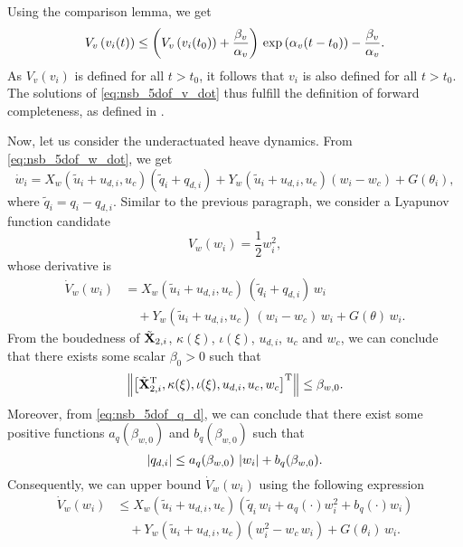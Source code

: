 Using the comparison lemma, we get
\begin{equation}
    V_v\left(v_i(t)\right) \leq \left(V_v\left(v_i(t_0)\right) + \frac{\beta_v}{\alpha_v}\right)\,{\rm exp}\left(\alpha_v(t - t_0)\right) - \frac{\beta_v}{\alpha_v}.
\end{equation}
As $V_v(v_i)$ is defined for all $t > t_0$, it follows that $v_i$ is also defined for all $t > t_0$.
The solutions of \eqref{eq:nsb_5dof_v_dot} thus fulfill the definition of forward completeness, as defined in \cite{angeli_forward_1999}.

Now, let us consider the underactuated heave dynamics.
From \eqref{eq:nsb_5dof_w_dot}, we get
\begin{equation}
    \dot{w}_i = X_w\!\left(\tilde{u}_i + u_{d,i}, u_c\right)\left(\tilde{q}_i + q_{d,i}\right) + Y_w\!\left(\tilde{u}_i + u_{d,i}, u_c\right)\left(w_i - w_c\right) + G(\theta_i),
\end{equation}
where $\tilde{q}_i = q_i - q_{d,i}$.
Similar to the previous paragraph, we consider a Lyapunov function candidate
\begin{equation}
    V_w(w_i) = \frac{1}{2} w_i^2, \label{eq:nsb_5dof_V_w}
\end{equation}
whose derivative is
\begin{equation}
    \begin{split}
        \dot{V}_w(w_i) &= X_w\left(\tilde{u}_i + u_{d,i}, u_c\right)\,\left(\tilde{q}_i + q_{d,i}\right)\,w_i \\
        &\quad + Y_w\left(\tilde{u}_i + u_{d,i}, u_c\right)\,\left(w_i - w_c\right)\,w_i + G(\theta)\,w_i.
    \end{split}
\end{equation}
From the boudedness of $\tilde{\mathbf{X}}_{2,i}$, $\kappa(\xi)$, $\iota(\xi)$, $u_{d,i}$, $u_c$ and $w_c$, we can conclude that there exists some scalar $\beta_0 > 0$ such that 
\begin{equation}
    \left\| \left[ \tilde{\mathbf{X}}_{2,i}^{\mathrm{T}}, \kappa(\xi), \iota(\xi), u_{d,i}, u_c, w_c \right]^{\mathrm{T}} \right\| \leq \beta_{w,0}.
\end{equation}
Moreover, from \eqref{eq:nsb_5dof_q_d}, we can conclude that there exist some positive functions $a_q(\beta_{w,0})$ and $b_q(\beta_{w,0})$ such that
\begin{equation}
    \left|q_{d,i}\right| \leq a_q(\beta_{w,0})\,\left|w_i\right| + b_q(\beta_{w,0}).
\end{equation}
Consequently, we can upper bound $\dot{V}_w(w_i)$ using the following expression
\begin{equation}
    \begin{split}
        \dot{V}_w(w_i) &\leq X_w\left(\tilde{u}_i + u_{d,i}, u_c\right)\left(\tilde{q}_i\,w_i + a_q(\cdot)w_i^2 + b_q(\cdot)w_i\right) \\
        &\quad + Y_w\left(\tilde{u}_i + u_{d,i}, u_c\right)\left(w_i^2 - w_c\,w_i\right) + G(\theta_i)\,w_i.
    \end{split}
\end{equation}
